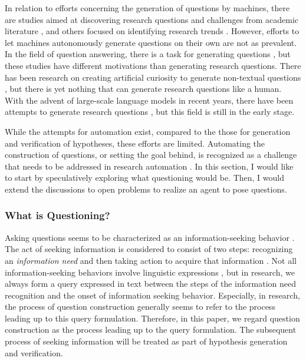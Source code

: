 In relation to efforts concerning the generation of questions by machines, there are studies aimed at discovering research questions and challenges from academic literature \cite{lahav2022search,liu2023creative,oppenlaender2023mapping,surita2020can}, and others focused on identifying research trends \cite{krenn2020predicting,krenn2022predicting}. However, efforts to let machines autonomously generate questions on their own are not as prevalent. In the field of question answering, there is a task for generating questions \cite{pan2019recent,zhang2021review}, but these studies have different motivations than generating research questions. There has been research on creating artificial curiosity to generate non-textual questions \cite{schmidhuber1991possibility}, but there is yet nothing that can generate research questions like a human. With the advent of large-scale language models in recent years, there have been attempts to generate research questions \cite{liu2023creative,lahat2023evaluating}, but this field is still in the early stage.

While the attempts for automation exist, compared to the those for generation and verification of hypotheses, these efforts are limited. Automating the construction of questions, or setting the goal behind, is recognized as a challenge that needs to be addressed in research automation \cite{coley2020autonomousII,zenil2023,kitano2021nobel}. In this section, I would like to start by speculatively exploring what questioning would be. Then, I would extend the discussions to open problems to realize an agent to pose questions.


\subsubsection{What is Questioning?}
Asking questions seems to be characterized as an information-seeking behavior \cite{watson_2021,taylor1962process}. The act of seeking information is considered to consist of two steps: recognizing an \textit{information need} and then taking action to acquire that information \cite{wilson1997information,case2016looking}. Not all information-seeking behaviors involve linguistic expressions \cite{watson_2021}, but in research, we always form a query expressed in text between the steps of the information need recognition and the onset of information seeking behavior. Especially, in research, the process of question construction generally seems to refer to the process leading up to this query formulation. Therefore, in this paper, we regard question construction as the process leading up to the query formulation. The subsequent process of seeking information will be treated as part of hypothesis generation and verification.

